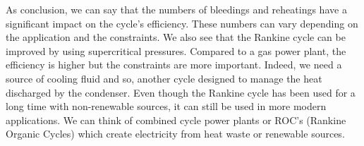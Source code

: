 As conclusion, we can say that the numbers of bleedings and reheatings have a significant impact on the cycle's efficiency.
These numbers can vary depending on the application and the constraints. We also see that the Rankine cycle can be improved 
by using supercritical pressures. Compared to a gas power plant, the efficiency is higher but the constraints are more important.
Indeed, we need a source of cooling fluid and so, another cycle designed to manage the heat discharged by the condenser. Even though the 
Rankine cycle has been used for a long time with non-renewable sources, it can still be used in more modern applications. We can think
of combined cycle power plants or ROC's (Rankine Organic Cycles) which create electricity from heat waste or renewable sources.